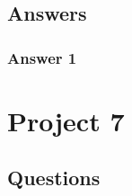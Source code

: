 \documentclass[a4paper, 12pt, english]{article}
\begin{document}
    \subsection{Answers}

    \subsubsection{Answer 1}

    \newpage


    \section{Project 7}

    \subsection{Questions}
\end{document}
